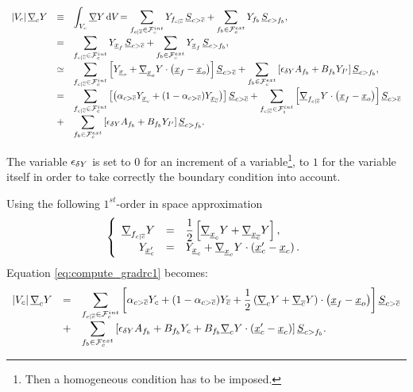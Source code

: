 \begin{equation}\label{eq:compute_gradrc1}
\begin{array}{r c l}
\left| V_{c} \right| \underline{\nabla}_{c} Y &
\equiv & \displaystyle
\int_{V_{c}}{\underline{\nabla} Y \, \mathrm{d} V_{} }
= \sum\limits_{ {{f}_{c|{\overline{c}}}} \in \mathcal{F}^{int}_{c}}
Y_{{{f}_{c|{\overline{c}}}}}\,{\underline{S}_{{c > {\overline{c}}}}}
+\sum\limits_{ {{f}_{b}} \in \mathcal{F}^{ext}_{c}}
Y_{{{f}_{b}}}\,{\underline{S}_{{c>{{f}_{b}}} }}, \\
&=& \displaystyle
 \sum\limits_{ {{f}_{c|{\overline{c}}}} \in \mathcal{F}^{int}_{c}}
Y_{\underline{x}_{{f}}}\,{\underline{S}_{{c > {\overline{c}}}}}
+\sum\limits_{ {{f}_{b}} \in \mathcal{F}^{ext}_{c}}
Y_{\underline{x}_{{f}}}\,{\underline{S}_{{c>{{f}_{b}}} }}, \\
&\simeq &  \displaystyle
\sum\limits_{ {{f}_{c|{\overline{c}}}} \in \mathcal{F}^{int}_{c}} \left[ Y_{\underline{x}_o}+ \underline{\nabla}_{\underline{x}_o} Y \cdot \left(\underline{x}_{{f}} - \underline{x}_o\right) \right] \underline{S}_{{c > {\overline{c}}}}+
\sum\limits_{ {{f}_{b}} \in \mathcal{F}^{ext}_{c}} \left[ \epsilon_{\delta Y} A_{{{f}_{b}}} + B_{{{f}_{b}}} Y_{{I^\prime}} \right] \underline{S}_{{c>{{f}_{b}}}} ,\\
 & = &\displaystyle
\sum\limits_{ {{f}_{c|{\overline{c}}}} \in \mathcal{F}^{int}_{c}}
\left[
\left( \alpha_{{c > {\overline{c}}}} Y_{{\underline{x}_{c}}} +
(1 - \alpha_{{c > {\overline{c}}}}) Y_{\underline{x}_{{\overline{c}}}} \right) \right] \underline{S}_{{c > {\overline{c}}}} +
\sum\limits_{ {{f}_{c|{\overline{c}}}} \in \mathcal{F}^{int}_{i}} \left[
\underline{\nabla}_{{{f}_{c|{\overline{c}}}}} Y  \cdot  \left(\underline{x}_{{f}} - \underline{x}_o\right) \right] \underline{S}_{{c > {\overline{c}}}} \\
&+&\displaystyle
\sum\limits_{ {{f}_{b}} \in \mathcal{F}^{ext}_{c}} \left[ \epsilon_{\delta Y} A_{{{f}_{b}}} + B_{{{f}_{b}}} Y_{{I^\prime}} \right] \underline{S}_{{c>{{f}_{b}}}} .
\end{array}
\end{equation}

The variable $\epsilon_{\delta Y}$ is set to $0$ for an increment of a variable\footnote{
Then a homogeneous condition has to be imposed.
},
 to $1$ for the variable itself in order to take
correctly the boundary condition into account.

Using the following $1^{st}$-order in space approximation
\begin{equation}\notag
\left\{\begin{array}{r c l}
\underline{\nabla}_{{{f}_{c|{\overline{c}}}}} Y & = & \displaystyle \dfrac{1}{2}\left[ \underline{\nabla}_{{\underline{x}_{c}}} Y + \underline{\nabla}_{\underline{x}_{{\overline{c}}}} Y \right],\\
Y_{\underline{x}_{c}^\prime} &= & Y_{{\underline{x}_{c}}} + \underline{\nabla}_{{\underline{x}_{c}}} Y \cdot \left(\underline{x}_{c}^\prime - {\underline{x}_{c}}\right) .
\end{array}\right .
\end{equation}
Equation \eqref{eq:compute_gradrc1} becomes:
%
\begin{equation*}
\begin{array}{r c l}
\left| V_{c} \right| \underline{\nabla}_{c} Y &=&
\displaystyle
\sum\limits_{{{f}_{c|{\overline{c}}}} \in \mathcal{F}^{int}_{c}}
\left[\alpha_{{c > {\overline{c}}}} Y_{c}
+ (1 - \alpha_{{c > {\overline{c}}}}) Y_{{\overline{c}}}  + \frac{1}{2}
\left( \underline{\nabla}_{c} Y +\underline{\nabla}_{{\overline{c}}} Y\right) \cdot \left(\underline{x}_{{f}} - \underline{x}_o\right)  \right] {\underline{S}_{{c> {\overline{c}}}}}\\
&+& \displaystyle
\sum\limits_{{{f}_{b}} \in \mathcal{F}^{ext}_{c}}
\left[ \epsilon_{\delta Y}A_{{{f}_{b}}} +
B_{{{f}_{b}}} Y_{c} + B_{{{f}_{b}}} \underline{\nabla}_{c} Y \cdot \left(\underline{x}_{c}^\prime - {\underline{x}_{c}}\right)
\right] \underline{S}_{{c>{{f}_{b}}}}.
\end{array}
\end{equation*}

